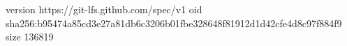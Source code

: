 version https://git-lfs.github.com/spec/v1
oid sha256:b95474a85cd3e27a81db6c3206b01fbe328648f81912d1d42cfe4d8c97f884f9
size 136819
